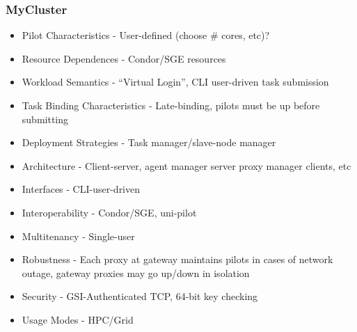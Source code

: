 \documentclass{sig-alternate}
\begin{document}



\subsubsection{MyCluster}
\begin{itemize}
  \item
    Pilot Characteristics - User-defined (choose \# cores, etc)?
  \item
    Resource Dependences - Condor/SGE resources
  \item
    Workload Semantics - ``Virtual Login'', CLI user-driven task submission
  \item
    Task Binding Characteristics - Late-binding, pilots must be up before submitting
  \item
    Deployment Strategies - Task manager/slave-node manager
  \item
    Architecture - Client-server, agent manager server proxy manager clients, etc
  \item
    Interfaces - CLI-user-driven
  \item
    Interoperability - Condor/SGE, uni-pilot
  \item
    Multitenancy - Single-user
  \item
    Robustness - Each proxy at gateway maintains pilots in cases of network outage, gateway proxies
    may go up/down in isolation
  \item
    Security - GSI-Authenticated TCP, 64-bit key checking
  \item
    Usage Modes - HPC/Grid
\end{itemize}
\end{document}

